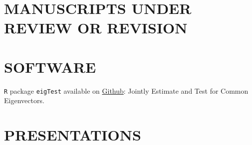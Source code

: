 \documentclass[pdftex,11pt]{article}	%
\begin{document}
\section*{MANUSCRIPTS UNDER REVIEW OR REVISION}
\vspace{.7em}
\printbibliography[heading=none, resetnumbers=true, keyword=submitted]
%

%

\section*{SOFTWARE}
\vspace{.7em}
\lstinline|R| package \lstinline|eigTest| available on \href{https://github.com/XycYuchenXu/eigTest}{Github}: Jointly Estimate and Test for Common Eigenvectors.

\section*{PRESENTATIONS}
\vspace{.7em}
%

\end{document}
